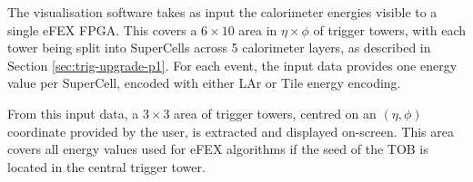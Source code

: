 The visualisation software takes as input the calorimeter energies visible to a
single \ac{eFEX} \ac{FPGA}. This covers a $6\times10$ area in $\eta\times\phi$
of trigger towers, with each tower being split into SuperCells across 5
calorimeter layers, as described in Section \ref{sec:trig-upgrade-p1}.
For each event, the input data provides one energy value per SuperCell, encoded
with either LAr or Tile energy encoding.

From this input data, a $3\times3$ area of trigger towers, centred on an
$(\eta,\phi)$ coordinate provided by the user, is extracted and displayed
on-screen. This area covers all energy values used for \ac{eFEX} algorithms if
the seed of the TOB is located in the central trigger tower.

